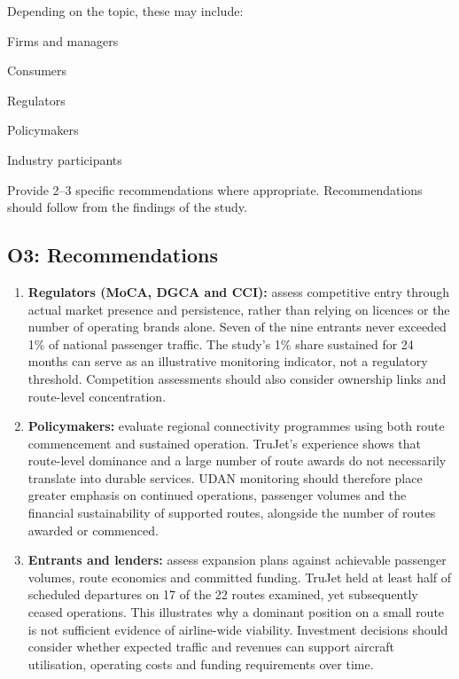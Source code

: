 \documentclass[12pt,a4paper]{article}
\newenvironment{o3box}{\ifthenelse{\boolean{o3highlight}}{\begingroup\color{o3sky}}{}}{\ifthenelse{\boolean{o3highlight}}{\endgroup}{}}
\newcommand{\templatebullet}[1]{\par\noindent\textbullet\hspace{5.88pt}#1\par}
\begin{document}
Depending on the topic, these may include:
\templatebullet{Firms and managers}
\templatebullet{Consumers}
\templatebullet{Regulators}
\templatebullet{Policymakers}
\templatebullet{Industry participants}
Provide 2--3 specific recommendations where appropriate. Recommendations should follow from the findings of the study.

\begin{o3box}
\subsection{O3: Recommendations}

\begin{enumerate}
    \item \textbf{Regulators (MoCA, DGCA and CCI):} assess competitive entry through actual market presence and persistence, rather than relying on licences or the number of operating brands alone. Seven of the nine entrants never exceeded 1\% of national passenger traffic. The study's 1\% share sustained for 24 months can serve as an illustrative monitoring indicator, not a regulatory threshold. Competition assessments should also consider ownership links and route-level concentration.

    \item \textbf{Policymakers:} evaluate regional connectivity programmes using both route commencement and sustained operation. TruJet's experience shows that route-level dominance and a large number of route awards do not necessarily translate into durable services. UDAN monitoring should therefore place greater emphasis on continued operations, passenger volumes and the financial sustainability of supported routes, alongside the number of routes awarded or commenced.

    \item \textbf{Entrants and lenders:} assess expansion plans against achievable passenger volumes, route economics and committed funding. TruJet held at least half of scheduled departures on 17 of the 22 routes examined, yet subsequently ceased operations. This illustrates why a dominant position on a small route is not sufficient evidence of airline-wide viability. Investment decisions should consider whether expected traffic and revenues can support aircraft utilisation, operating costs and funding requirements over time.
\end{enumerate}


\end{o3box}
\end{document}
